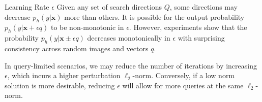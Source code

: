 Learning Rate $\epsilon$ Given any set of search directions $Q$, some directions may decrease $p_h(y | \mathbf{x})$ more than others. It is possible for the output probability $p_h(y | \mathbf{x} + \epsilon q)$ to be non-monotonic in $\epsilon$. However, experiments show that the probability $p_h(y | \mathbf{x} \pm \epsilon q)$ decreases monotonically in $\epsilon$ with surprising consistency across random images and vectors $q$.

In query-limited scenarios, we may reduce the number of iterations by increasing $\epsilon$, which incurs a higher perturbation $\ell_2$-norm. Conversely, if a low norm solution is more desirable, reducing $\epsilon$ will allow for more queries at the same $\ell_2$-norm.
